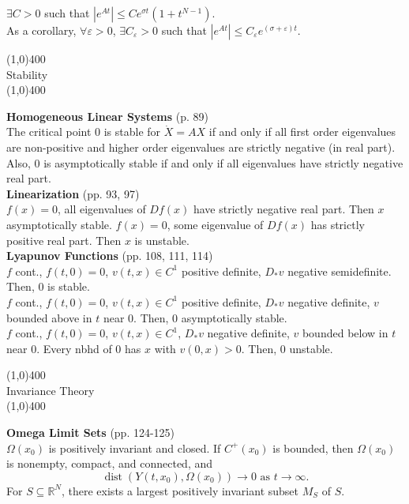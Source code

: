 \documentclass[11pt]{article}
\newcommand{\R}{\mathbb{R}}                         %
\newcommand{\e}{\varepsilon}                        %
\newcommand{\dist}{\operatorname{dist}}                 %
\begin{document}
$\exists C > 0$ such that $|e^{At}| \leq Ce^{\sigma t}(1 + t^{N - 1})$.\\
As a corollary, $\forall \e > 0$, $\exists C_\e > 0$ such that
$|e^{At}| \leq C_\e e^{(\sigma + \e)t}$.
\begin{center}
\line(1,0){400}\\
{\large Stability}\\
\vspace{-0.1in}
\line(1,0){400}
\end{center}
{\bf Homogeneous Linear Systems} (p. 89)\\
The critical point $0$ is stable for $\dot X = AX$ if and only if all first
order eigenvalues are non-positive and higher order eigenvalues are strictly
negative (in real part).\\
Also, $0$ is asymptotically stable if and only if all eigenvalues have strictly
negative real part.\\
{\bf Linearization} (pp. 93, 97)\\
$f(x) = 0$, all eigenvalues of $Df(x)$ have strictly negative real part.
Then $x$ asymptotically stable.
$f(x) = 0$, some eigenvalue of $Df(x)$ has strictly positive real part.
Then $x$ is unstable.\\
{\bf Lyapunov Functions} (pp. 108, 111, 114)\\
$f$ cont., $f(t,0) = 0$, $v(t,x) \in C^1$ positive
definite, $D_*v$ negative semidefinite. Then, $0$ is stable.\\
$f$ cont., $f(t,0) = 0$, $v(t,x) \in C^1$ positive definite, $D_*v$ negative
definite, $v$ bounded above in $t$ near $0$. Then, $0$ asymptotically stable.\\
$f$ cont., $f(t,0) = 0$, $v(t,x) \in C^1$, $D_*v$ negative
definite, $v$ bounded below in $t$ near $0$. Every nbhd of $0$ has $x$ with
$v(0,x) > 0$. Then, $0$ unstable.
\newpage
\begin{center}
\line(1,0){400}\\
{\large Invariance Theory}\\
\vspace{-0.1in}
\line(1,0){400}
\end{center}
{\bf Omega Limit Sets} (pp. 124-125)\\
$\Omega(x_0)$ is positively invariant and closed. If $C^+(x_0)$ is bounded,
then $\Omega(x_0)$ is nonempty, compact, and connected, and
\[\dist(Y(t,x_0),\Omega(x_0)) \to 0 \mbox{ as } t \to \infty.\]
For $S \subseteq \R^N$, there exists a largest positively invariant subset
$M_S$ of $S$.\\
\end{document}
